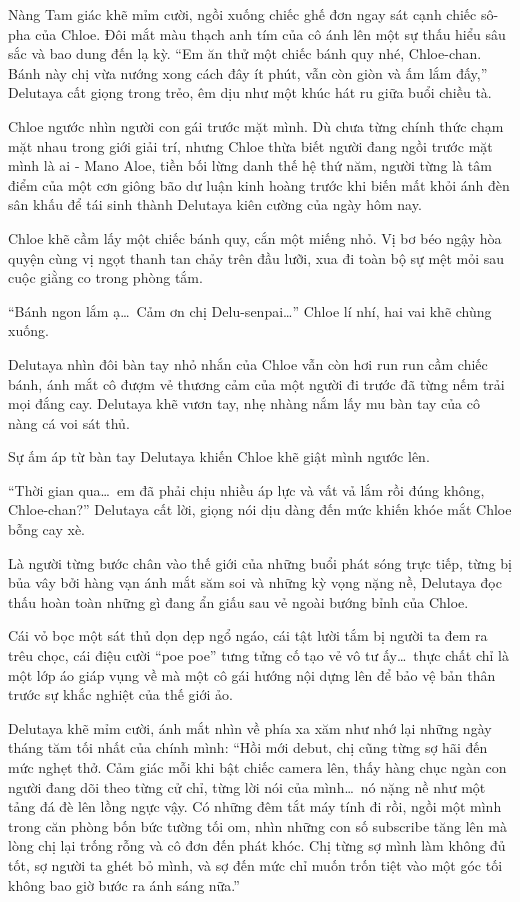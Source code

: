 \documentclass[../main.tex]{subfiles}
\begin{document}
Nàng Tam giác khẽ mỉm cười, ngồi xuống chiếc ghế đơn ngay sát cạnh chiếc sô-pha của Chloe. Đôi mắt màu thạch anh tím của cô ánh lên một sự thấu hiểu sâu sắc và bao dung đến lạ kỳ. ``Em ăn thử một chiếc bánh quy nhé, Chloe-chan. Bánh này chị vừa nướng xong cách đây ít phút, vẫn còn giòn và ấm lắm đấy,'' Delutaya cất giọng trong trẻo, êm dịu như một khúc hát ru giữa buổi chiều tà.

Chloe ngước nhìn người con gái trước mặt mình. Dù chưa từng chính thức chạm mặt nhau trong giới giải trí, nhưng Chloe thừa biết người đang ngồi trước mặt mình là ai - Mano Aloe, tiền bối lừng danh thế hệ thứ năm, người từng là tâm điểm của một cơn giông bão dư luận kinh hoàng trước khi biến mất khỏi ánh đèn sân khấu để tái sinh thành Delutaya kiên cường của ngày hôm nay.

Chloe khẽ cầm lấy một chiếc bánh quy, cắn một miếng nhỏ. Vị bơ béo ngậy hòa quyện cùng vị ngọt thanh tan chảy trên đầu lưỡi, xua đi toàn bộ sự mệt mỏi sau cuộc giằng co trong phòng tắm.

``Bánh ngon lắm ạ\dots\ Cảm ơn chị Delu-senpai\dots'' Chloe lí nhí, hai vai khẽ chùng xuống.

Delutaya nhìn đôi bàn tay nhỏ nhắn của Chloe vẫn còn hơi run run cầm chiếc bánh, ánh mắt cô đượm vẻ thương cảm của một người đi trước đã từng nếm trải mọi đắng cay. Delutaya khẽ vươn tay, nhẹ nhàng nắm lấy mu bàn tay của cô nàng cá voi sát thủ.

Sự ấm áp từ bàn tay Delutaya khiến Chloe khẽ giật mình ngước lên.

``Thời gian qua\dots\ em đã phải chịu nhiều áp lực và vất vả lắm rồi đúng không, Chloe-chan?'' Delutaya cất lời, giọng nói dịu dàng đến mức khiến khóe mắt Chloe bỗng cay xè.

Là người từng bước chân vào thế giới của những buổi phát sóng trực tiếp, từng bị bủa vây bởi hàng vạn ánh mắt săm soi và những kỳ vọng nặng nề, Delutaya đọc thấu hoàn toàn những gì đang ẩn giấu sau vẻ ngoài bướng bỉnh của Chloe.

Cái vỏ bọc một sát thủ dọn dẹp ngổ ngáo, cái tật lười tắm bị người ta đem ra trêu chọc, cái điệu cười ``poe poe'' tưng tửng cố tạo vẻ vô tư ấy\dots\ thực chất chỉ là một lớp áo giáp vụng về mà một cô gái hướng nội dựng lên để bảo vệ bản thân trước sự khắc nghiệt của thế giới ảo.

Delutaya khẽ mỉm cười, ánh mắt nhìn về phía xa xăm như nhớ lại những ngày tháng tăm tối nhất của chính mình: ``Hồi mới debut, chị cũng từng sợ hãi đến mức nghẹt thở. Cảm giác mỗi khi bật chiếc camera lên, thấy hàng chục ngàn con người đang dõi theo từng cử chỉ, từng lời nói của mình\dots\ nó nặng nề như một tảng đá đè lên lồng ngực vậy. Có những đêm tắt máy tính đi rồi, ngồi một mình trong căn phòng bốn bức tường tối om, nhìn những con số subscribe tăng lên mà lòng chị lại trống rỗng và cô đơn đến phát khóc. Chị từng sợ mình làm không đủ tốt, sợ người ta ghét bỏ mình, và sợ đến mức chỉ muốn trốn tiệt vào một góc tối không bao giờ bước ra ánh sáng nữa.''
\end{document}
